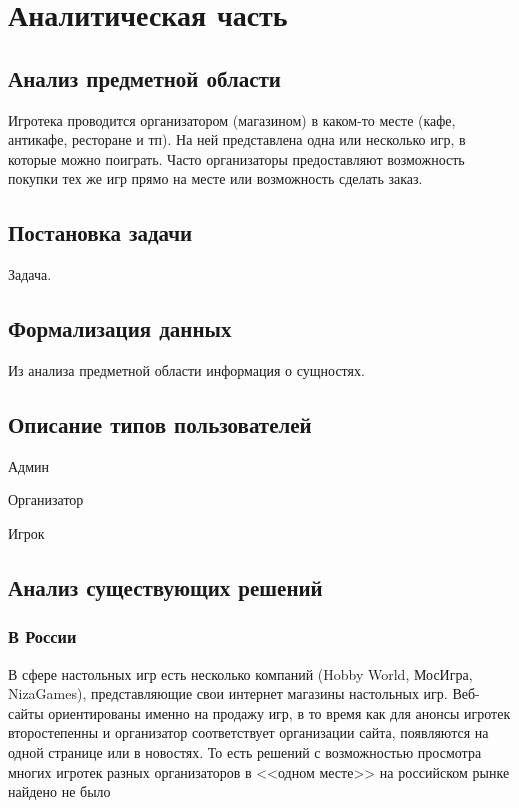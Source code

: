 \chapter{Аналитическая часть}

\section{Анализ предметной области}

Игротека проводится организатором (магазином) в каком-то месте (кафе, антикафе,
ресторане и тп). На ней представлена одна или несколько игр, в которые можно
поиграть. Часто организаторы предоставляют возможность покупки тех же игр прямо
на месте или возможность сделать заказ.

\section{Постановка задачи}

Задача.

\section{Формализация данных}

Из анализа предметной области информация о сущностях.

\section{Описание типов пользователей}

Админ

Организатор

Игрок

\section{Анализ существующих решений}

\subsection{В России}

В сфере настольных игр есть несколько компаний (Hobby World, МосИгра,
NizaGames), представляющие свои интернет магазины настольных игр. Веб-сайты
ориентированы именно на продажу игр, в то время как для анонсы игротек
второстепенны и организатор соответствует организации сайта, появляются на одной
странице или в новостях. То есть решений с возможностью просмотра многих игротек
разных организаторов в <<одном месте>> на российском рынке найдено не было


